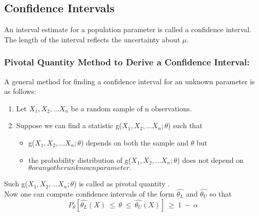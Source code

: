 \subsection*{Confidence Intervals}
An interval estimate for a population parameter is called a
confidence interval.\\
The length of the interval reflects the uncertainty about $\mu$.
\subsubsection*{Pivotal Quantity Method to Derive a Confidence Interval:}
A general method for finding a confidence interval for an
unknown parameter is as follows:
\begin{enumerate}
    \item Let $X_1,X_2,...X_n$ be a random sample of n observations.
    \item Suppose we can find a statistic g($X_1,X_2,...X_n; \theta$) such that
    \begin{itemize}
        \item g($X_1,X_2,...X_n; \theta$) depends on both the sample and $\theta$ but
        \item the probability distribution of g($X_1,X_2,...X_n; \theta$) does not depend on $\theta or any other unknown parameter.$
    \end{itemize}
\end{enumerate}
Such g($X_1,X_2,...X_n; \theta$) is called as pivotal quantity .\\
Now one can compute confidence intervals of
the form $\hat{\theta_L}$ and $\hat{\theta_U}$ so that 
\[ P_\theta[\hat{\theta_L}(X)\ \leq\ \theta\ \leq\ \hat{\theta_U}(X)]\ \geq\ 1\ -\ \alpha \]